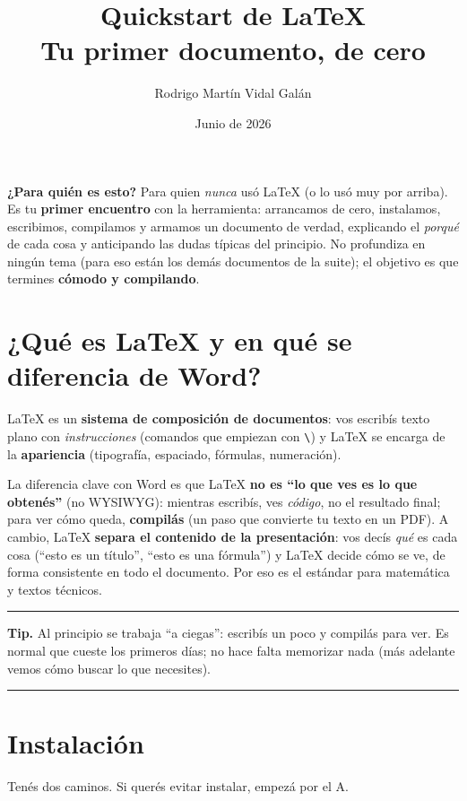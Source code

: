 \documentclass[11pt,a4paper]{article}
\title{\textbf{Quickstart de \LaTeX}\\[2pt]\large Tu primer documento, de cero}
\author{Rodrigo Martín Vidal Galán}
\date{Junio de 2026}
\newenvironment{tip}{\par\smallskip\noindent\begin{center}%
  \begin{minipage}{0.94\linewidth}\small\color{codekw!85!black}\rule{\linewidth}{0.4pt}\par\nobreak
  \textbf{Tip.}\enspace}{\par\rule{\linewidth}{0.4pt}\end{minipage}\end{center}\smallskip}
\begin{document}
\maketitle

\noindent\textbf{¿Para quién es esto?} Para quien \emph{nunca} usó \LaTeX{} (o lo
usó muy por arriba). Es tu \textbf{primer encuentro} con la herramienta: arrancamos
de cero, instalamos, escribimos, compilamos y armamos un documento de verdad,
explicando el \emph{porqué} de cada cosa y anticipando las dudas típicas del
principio. No profundiza en ningún tema (para eso están los demás documentos de la
suite); el objetivo es que termines \textbf{cómodo y compilando}.

\newpage
\tableofcontents
\newpage

\section{¿Qué es LaTeX y en qué se diferencia de Word?}
\LaTeX{} es un \textbf{sistema de composición de documentos}: vos escribís texto
plano con \emph{instrucciones} (comandos que empiezan con \texttt{\textbackslash})
y \LaTeX{} se encarga de la \textbf{apariencia} (tipografía, espaciado, fórmulas,
numeración).

La diferencia clave con Word es que \LaTeX{} \textbf{no es \enquote{lo que ves es
lo que obtenés}} (no WYSIWYG): mientras escribís, ves \emph{código}, no el
resultado final; para ver cómo queda, \textbf{compilás} (un paso que convierte tu
texto en un PDF). A cambio, \LaTeX{} \textbf{separa el contenido de la
presentación}: vos decís \emph{qué} es cada cosa (\enquote{esto es un título},
\enquote{esto es una fórmula}) y \LaTeX{} decide cómo se ve, de forma consistente
en todo el documento. Por eso es el estándar para matemática y textos técnicos.

\begin{tip}
Al principio se trabaja \enquote{a ciegas}: escribís un poco y compilás para ver.
Es normal que cueste los primeros días; no hace falta memorizar nada (más adelante
vemos cómo buscar lo que necesites).
\end{tip}

\section{Instalación}
Tenés dos caminos. Si querés evitar instalar, empezá por el A.
\end{document}
